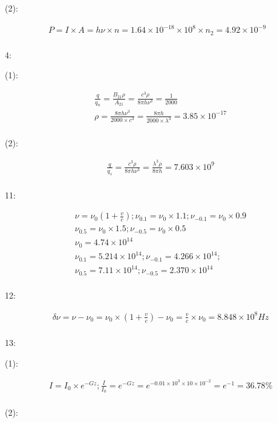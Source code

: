 \documentclass{article}
\begin{document}
(2):

\begin{align*}
  P=I \times A=h\nu \times n=1.64 \times 10^{-18} \times 10^8 \times n_2=4.92 \times 10^{-9}\\
\end{align*}

4:

(1):

\begin{align*}
  &\frac{q}{q_n}=\frac{B_{21}\rho}{A_{21}}=\frac{c^3\rho}{8\pi h\nu^3}=\frac1{2000}\\
  &\rho=\frac{8\pi h\nu^3}{2000 \times c^3}=\frac{8\pi h}{2000 \times \lambda^3}=3.85 \times 10^{-17} \\
\end{align*}

(2):

\begin{align*}
  &\frac{q}{q_s}=\frac{c^3\rho}{8\pi h\nu^3}=\frac{\lambda^3\rho}{8\pi h}=7.603 \times 10^9\\
\end{align*}

11:

\begin{align*}
&\nu=\nu_0(1+\frac vc);\nu_{0.1}=\nu_0 \times 1.1;\nu_{-0.1}=\nu_0 \times 0.9\\
&\nu_{0.5}=\nu_0 \times 1.5;\nu_{-0.5}=\nu_0 \times 0.5\\
&\nu_0=4.74 \times 10^{14}\\
&\nu_{0.1}=5.214 \times 10^{14};\nu_{-0.1}=4.266 \times 10^{14};\\
&\nu_{0.5}=7.11 \times 10^{14};\nu_{-0.5}=2.370 \times 10^{14}\\
\end{align*}

12:

\begin{align*}
 & \delta \nu=\nu-\nu_0=\nu_0 \times (1+\frac vc)-\nu_0= \frac vc\times \nu_0=8.848 \times 10^{8}Hz\\
\end{align*}

13:

(1):

\begin{align*}
&I=I_0\times e^{-Gz};\frac{I}{I_0}=e^{-Gz}=e^{-0.01 \times 10^3 \times 10 \times 10^{-2}}=e^{-1}=36.78\%\\
\end{align*}

(2):
\end{document}
